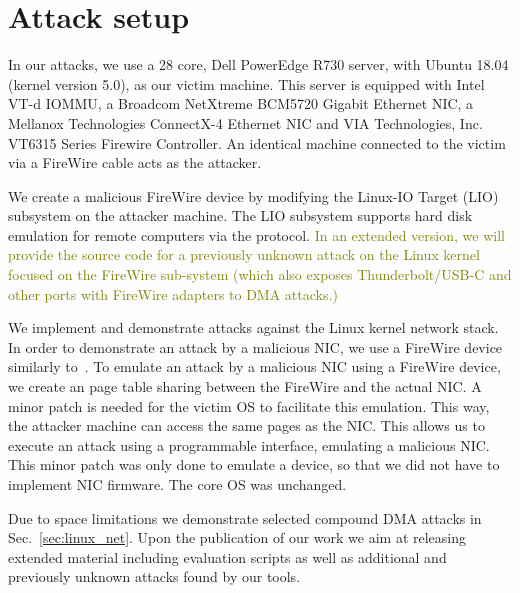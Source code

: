 \section{Attack setup}


In our attacks, we use a 28 core, Dell PowerEdge R730 server, with Ubuntu 18.04 (kernel version 5.0), as our victim machine. This server is equipped with Intel VT-d IOMMU, a Broadcom NetXtreme BCM5720 Gigabit Ethernet NIC, a Mellanox Technologies ConnectX-4 Ethernet NIC and VIA Technologies, Inc. VT6315 Series Firewire Controller. An identical machine connected to the victim via a FireWire cable acts as the attacker. 

We create a malicious FireWire device by modifying the Linux-IO Target (LIO) subsystem on the attacker machine. The LIO subsystem supports hard disk emulation for remote computers via the \spb{} protocol. \textcolor{olive}{In an extended version, we will provide the source code for a previously unknown \simple attack on the Linux kernel focused on the FireWire sub-system (which also exposes Thunderbolt/USB-C and other ports with FireWire adapters to DMA attacks.)}

We implement and demonstrate \compound attacks against the Linux kernel network stack. In order to demonstrate an attack by a malicious NIC, we use a FireWire device similarly to~\cite{SLND10}. To emulate an attack by a malicious NIC using a FireWire device, we create an \iova{} page table sharing between the FireWire and the actual NIC. A minor patch is needed for the victim OS to facilitate this emulation. This way, the attacker machine can access the same pages as the NIC. This allows us to execute an attack using a programmable interface, emulating a malicious NIC. This minor patch was only done to emulate a device, so that we did not have to implement NIC firmware. The core OS was unchanged.

Due to space limitations we demonstrate selected compound DMA attacks in Sec.~\ref{sec:linux_net}. Upon the publication of our work we aim at releasing extended material including evaluation scripts as well as additional \compound and previously unknown \simple attacks found by our tools.